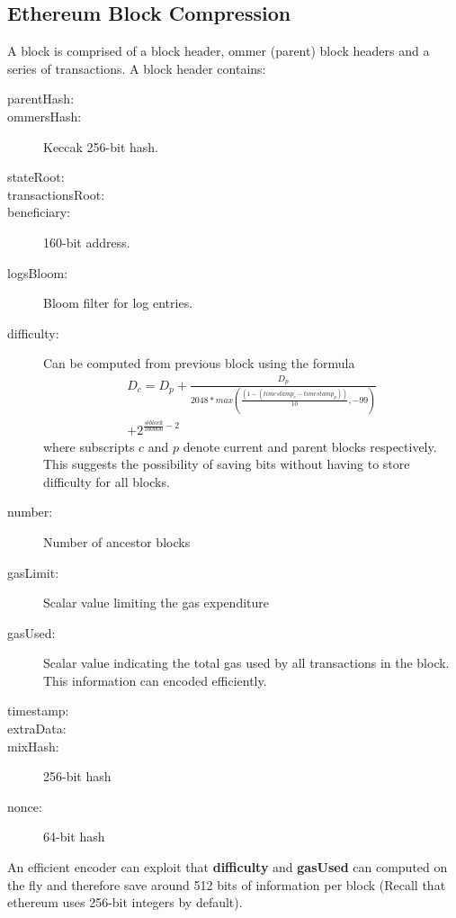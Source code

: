 \subsection{Ethereum Block Compression}\label{sec:blockcompress}

A block is comprised of a block header, ommer (parent) block headers and a series of transactions. 
A block header contains: 

\begin{description}
 \item[parentHash:] 
 \item[ommersHash:]  Keccak 256-bit hash.
 \item[stateRoot:]  
 \item[transactionsRoot:]
 \item[beneficiary:]160-bit address.
 \item[logsBloom:] Bloom filter for log entries.
 \item[difficulty:] Can be computed from previous block using the formula
	\begin{multline*}
	D_{c} = D_{p} + \frac{D_{p}}{2048 * max(\frac{(1 - (timestamp_{c} - timestamp_{p}))}{10}, -99)}\\ + 2^{\frac{\#block}{100000} - 2}
        \end{multline*}
	where subscripts $c$ and $p$ denote current and parent blocks respectively. 
 This suggests the possibility of saving bits without having to store difficulty for all blocks.
 \item[number:] Number of ancestor blocks
 \item[gasLimit:] Scalar value limiting the gas expenditure
 \item[gasUsed:] Scalar value indicating the total gas used by all transactions in the block. This information can encoded efficiently.
 \item[timestamp:]
 \item[extraData:]
 \item[mixHash:] 256-bit hash
 \item[nonce:] 64-bit hash
\end{description}

An efficient encoder can exploit that \textbf{difficulty} and \textbf{gasUsed} can computed on the fly and therefore save around 512 bits of information per block (Recall that ethereum uses 256-bit integers by default).  

